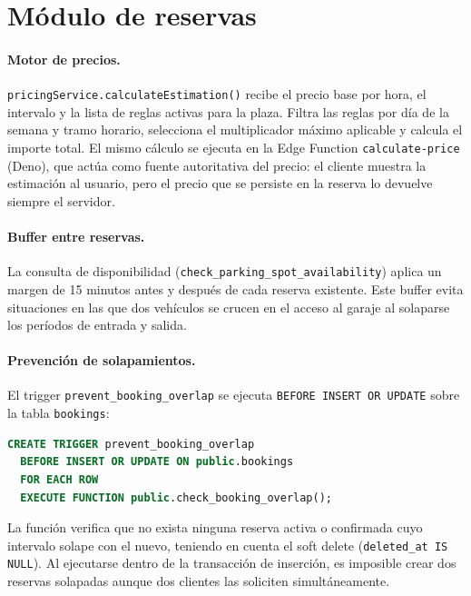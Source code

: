 \section{Módulo de reservas}
\label{sec:impl_reservas}

\paragraph{Motor de precios.}
\texttt{pricingService.calculateEstimation()} recibe el precio base por hora, el intervalo y la lista de reglas activas para la plaza. Filtra las reglas por día de la semana y tramo horario, selecciona el multiplicador máximo aplicable y calcula el importe total. El mismo cálculo se ejecuta en la Edge Function \texttt{calculate-price} (Deno), que actúa como fuente autoritativa del precio: el cliente muestra la estimación al usuario, pero el precio que se persiste en la reserva lo devuelve siempre el servidor.

\paragraph{Buffer entre reservas.}
La consulta de disponibilidad (\texttt{check\_parking\_spot\_availability}) aplica un margen de 15 minutos antes y después de cada reserva existente. Este buffer evita situaciones en las que dos vehículos se crucen en el acceso al garaje al solaparse los períodos de entrada y salida.

\paragraph{Prevención de solapamientos.}
El trigger \texttt{prevent\_booking\_overlap} se ejecuta \texttt{BEFORE INSERT OR UPDATE} sobre la tabla \texttt{bookings}:

\begin{lstlisting}[language=SQL, caption={Trigger de solapamiento en \texttt{bookings}.}, label=lst:overlap]
CREATE TRIGGER prevent_booking_overlap
  BEFORE INSERT OR UPDATE ON public.bookings
  FOR EACH ROW
  EXECUTE FUNCTION public.check_booking_overlap();
\end{lstlisting}

La función verifica que no exista ninguna reserva activa o confirmada cuyo intervalo solape con el nuevo, teniendo en cuenta el soft delete (\texttt{deleted\_at IS NULL}). Al ejecutarse dentro de la transacción de inserción, es imposible crear dos reservas solapadas aunque dos clientes las soliciten simultáneamente.

